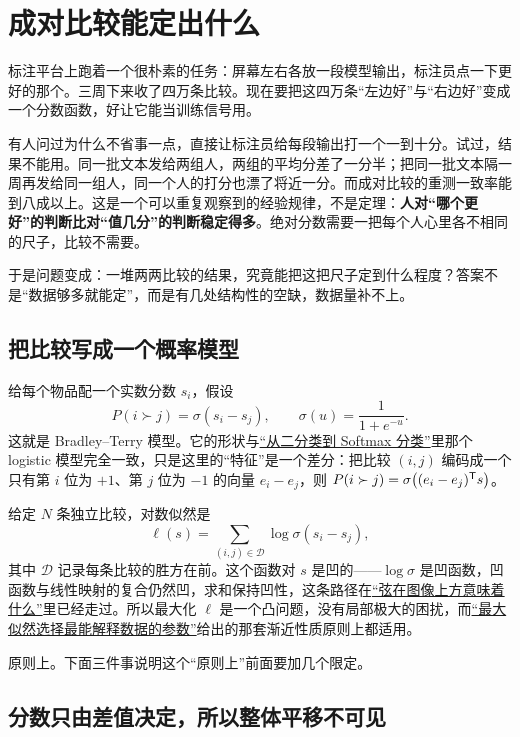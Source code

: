 \section{成对比较能定出什么}
\label{sec:17-Constrained-Guarantees/05-Learning-from-Comparisons/01}

标注平台上跑着一个很朴素的任务：屏幕左右各放一段模型输出，标注员点一下更好的那个。三周下来收了四万条比较。现在要把这四万条``左边好''与``右边好''变成一个分数函数，好让它能当训练信号用。

有人问过为什么不省事一点，直接让标注员给每段输出打一个一到十分。试过，结果不能用。同一批文本发给两组人，两组的平均分差了一分半；把同一批文本隔一周再发给同一组人，同一个人的打分也漂了将近一分。而成对比较的重测一致率能到八成以上。这是一个可以重复观察到的经验规律，不是定理：\textbf{人对``哪个更好''的判断比对``值几分''的判断稳定得多}。绝对分数需要一把每个人心里各不相同的尺子，比较不需要。

于是问题变成：一堆两两比较的结果，究竟能把这把尺子定到什么程度？答案不是``数据够多就能定''，而是有几处结构性的空缺，数据量补不上。

\subsection{把比较写成一个概率模型}

给每个物品配一个实数分数 \(s_i\)，假设
\[
P(i\succ j)=\sigma(s_i-s_j),\qquad \sigma(u)=\frac{1}{1+e^{-u}} .
\]
这就是 Bradley--Terry 模型。它的形状与\hyperref[sec:13-Machine-Learning/02-Linear-Models/03]{``从二分类到 Softmax 分类''}里那个 logistic 模型完全一致，只是这里的``特征''是一个差分：把比较 \((i,j)\) 编码成一个只有第 \(i\) 位为 \(+1\)、第 \(j\) 位为 \(-1\) 的向量 \(e_i-e_j\)，则 \(P(i\succ j)=\sigma\bigl((e_i-e_j)^{\mathsf{T}}s\bigr)\)。

给定 \(N\) 条独立比较，对数似然是
\[
\ell(s)=\sum_{(i,j)\in\mathcal{D}}\log\sigma(s_i-s_j),
\]
其中 \(\mathcal{D}\) 记录每条比较的胜方在前。这个函数对 \(s\) 是凹的——\(\log\sigma\) 是凹函数，凹函数与线性映射的复合仍然凹，求和保持凹性，这条路径在\hyperref[sec:09-Convex-Optimization/03-Convex-Functions/01]{``弦在图像上方意味着什么''}里已经走过。所以最大化 \(\ell\) 是一个凸问题，没有局部极大的困扰，而\hyperref[sec:11-Mathematical-Statistics/02-Point-Estimation/03]{``最大似然选择最能解释数据的参数''}给出的那套渐近性质原则上都适用。

原则上。下面三件事说明这个``原则上''前面要加几个限定。

\subsection{分数只由差值决定，所以整体平移不可见}

